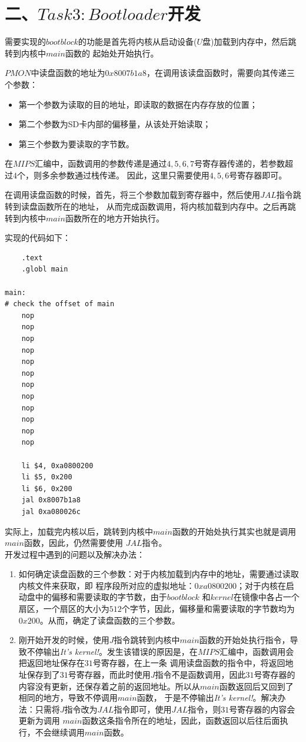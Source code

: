 \documentclass[UTF8,noindent]{ctexart}
\begin{document}
\section*{二、$Task3: Bootloader$开发}
需要实现的$bootblock$的功能是首先将内核从启动设备($U$盘)加载到内存中，然后跳转到内核中$main$函数的
起始处开始执行。

$PMON$中读盘函数的地址为$0x8007b1a8$，在调用该读盘函数时，需要向其传递三个参数：
\begin{itemize}
	\item 第一个参数为读取的目的地址，即读取的数据在内存存放的位置；
	\item 第二个参数为SD卡内部的偏移量，从该处开始读取；
	\item 	第三个参数为要读取的字节数。
\end{itemize}

在$MIPS$汇编中，函数调用的参数传递是通过$4,5,6,7$号寄存器传递的，若参数超过$4$个，则多余参数通过栈传递。
因此，这里只需要使用$4,5,6$号寄存器即可。

在调用读盘函数的时候，首先，将三个参数加载到寄存器中，然后使用$JAL$指令跳转到读盘函数所在的地址，
从而完成函数调用，将内核加载到内存中。之后再跳转到内核中$main$函数所在的地方开始执行。

实现的代码如下：
\begin{lstlisting}
	.text
	.globl main

main:
# check the offset of main
	nop
	nop
	nop
	nop
	nop
	nop
	nop
	nop
	nop
	nop
	nop
	nop

	li $4, 0xa0800200
	li $5, 0x200
	li $6, 0x200
	jal 0x8007b1a8
	jal 0xa080026c
\end{lstlisting}

实际上，加载完内核以后，跳转到内核中$main$函数的开始处执行其实也就是调用$main$函数，因此，仍然需要使用
$JAL$指令。\\

开发过程中遇到的问题以及解决办法：
\begin{enumerate}
	\item 如何确定读盘函数的三个参数：对于内核加载到内存中的地址，需要通过读取内核文件来获取，即
	程序段所对应的虚拟地址：$0xa0800200$；对于内核在启动盘中的偏移和需要读取的字节数，由于$bootblock$
	和$kernel$在镜像中各占一个扇区，一个扇区的大小为$512$个字节，因此，偏移量和需要读取的字节数均为
	$0x200$。从而，确定了读盘函数的三个参数。
	\item 
	刚开始开发的时候，使用$J$指令跳转到内核中$main$函数的开始处执行指令，导致不停输出\emph{It's
	 kernel!}。发生该错误的原因是，在$MIPS$汇编中，函数调用会把返回地址保存在$31$号寄存器，在上一条
 调用读盘函数的指令中，将返回地址保存到了$31$号寄存器，而此时使用$J$指令不是函数调用，因此$31$号寄存器的
 内容没有更新，还保存着之前的返回地址。所以从$main$函数返回后又回到了相同的地方，导致不停调用$main$函数，
 于是不停输出\emph{It's 
 kernel!}。解决办法：只需将$J$指令改为$JAL$指令即可，使用$JAL$指令，则$31$号寄存器的内容会更新为调用
 $main$函数这条指令所在的地址，因此，函数返回以后往后面执行，不会继续调用$main$函数。
\end{enumerate}
\end{document}
